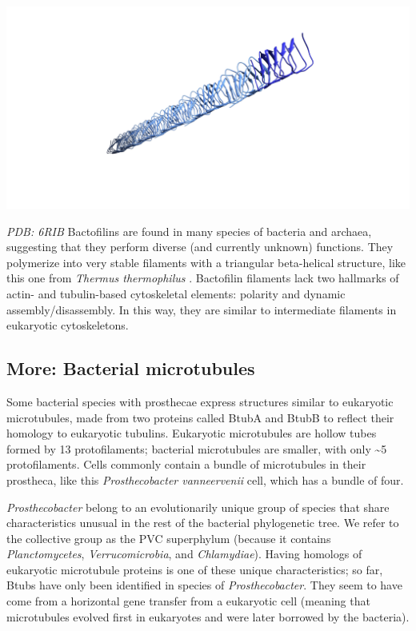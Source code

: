 \documentclass[]{tufte-book}
\begin{document}
\includegraphics{img/schematics/3_6_1}

\emph{PDB: 6RIB} Bactofilins are found in many species of bacteria and
archaea, suggesting that they perform diverse (and currently unknown)
functions. They polymerize into very stable filaments with a triangular
beta-helical structure, like this one from \emph{Thermus thermophilus}
\citep{deng2019}. Bactofilin filaments lack two hallmarks of actin- and
tubulin-based cytoskeletal elements: polarity and dynamic
assembly/disassembly. In this way, they are similar to intermediate
filaments in eukaryotic cytoskeletons.

\hypertarget{Bacterial_microtubules}{\subsection*{More: Bacterial
microtubules}\label{Bacterial_microtubules}}

Some bacterial species with prosthecae express structures similar to
eukaryotic microtubules, made from two proteins called BtubA and BtubB
to reflect their homology to eukaryotic tubulins. Eukaryotic
microtubules are hollow tubes formed by 13 protofilaments; bacterial
microtubules are smaller, with only \textasciitilde{}5 protofilaments.
Cells commonly contain a bundle of microtubules in their prostheca, like
this \emph{Prosthecobacter vanneervenii} cell, which has a bundle of
four.

\emph{Prosthecobacter} belong to an evolutionarily unique group of
species that share characteristics unusual in the rest of the bacterial
phylogenetic tree. We refer to the collective group as the PVC
superphylum (because it contains \emph{Planctomycetes},
\emph{Verrucomicrobia}, and \emph{Chlamydiae}). Having homologs of
eukaryotic microtubule proteins is one of these unique characteristics;
so far, Btubs have only been identified in species of
\emph{Prosthecobacter}. They seem to have come from a horizontal gene
transfer from a eukaryotic cell (meaning that microtubules evolved first
in eukaryotes and were later borrowed by the bacteria).
\end{document}
